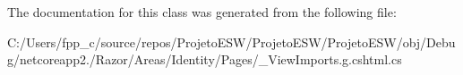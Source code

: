 The documentation for this class was generated from the following file\+:\begin{DoxyCompactItemize}
\item 
C\+:/\+Users/fpp\+\_\+c/source/repos/\+Projeto\+E\+S\+W/\+Projeto\+E\+S\+W/\+Projeto\+E\+S\+W/obj/\+Debug/netcoreapp2./\+Razor/\+Areas/\+Identity/\+Pages/\+\_\+\+View\+Imports.\+g.\+cshtml.\+cs\end{DoxyCompactItemize}
